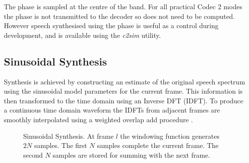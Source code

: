 \documentclass{article}
\begin{document}
The phase is sampled at the centre of the band.  For all practical Codec 2 modes the phase is not transmitted to the decoder so does not need to be computed.  However speech synthesised using the phase is useful as a control during development, and is available using the \emph{c2sim} utility.

\subsection{Sinusoidal Synthesis}

Synthesis is achieved by constructing an estimate of the original speech spectrum using the sinusoidal model parameters for the current frame. This information is then transformed to the time domain using an Inverse DFT (IDFT). To produce a continuous time domain waveform the IDFTs from adjacent frames are smoothly interpolated using a weighted overlap add procedure \cite{mcaulay1986speech}.

\begin{figure}[h]
\caption{Sinusoidal Synthesis.  At frame $l$ the windowing function generates $2N$ samples.  The first $N$ samples complete the current frame. The second $N$ samples are stored for summing with the next frame.}
\label{fig:synthesis}
\begin{center}
\end{center}
\end{figure}
\end{document}
